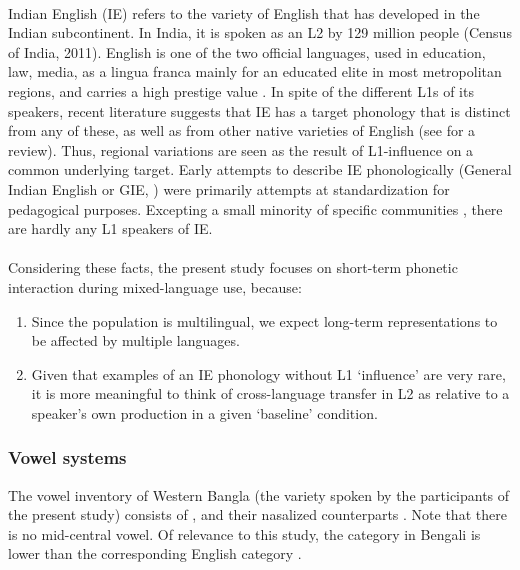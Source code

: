 \documentclass[11pt]{article}
\newcommand{\nt}[1]{\textipa{[#1]}} %
\begin{document}
	\paragraph{}Indian English (IE) refers to the variety of English that has developed in the Indian subcontinent. In India, it is spoken as an L2 by 129 million people (Census of India, 2011).  English is one of the two official languages, used in education, law, media, as a lingua franca mainly for an educated elite in most metropolitan regions, and carries a high prestige value \cite{tollefson2014language}.
	In spite of the different L1s of its speakers, recent literature suggests that IE has a target phonology that is distinct from any of these, as well as from other native varieties of English (see  for a review). Thus, regional variations are seen as the result of L1-influence on a common underlying target. Early attempts to describe IE phonologically (General Indian English or GIE, \cite{masica1972sound}) were primarily attempts at standardization for pedagogical purposes. Excepting a small minority of specific communities \cite{pandey201517}, there are hardly any L1 speakers of IE.\\
	
	\paragraph{}Considering these facts, the present study focuses on short-term phonetic interaction during mixed-language use, because:
\begin{enumerate}[label=(\roman*)]
	\item Since the population is multilingual, we expect long-term representations to be affected by multiple languages. 
	\item Given that examples of an IE phonology without L1 `influence' are very rare, it is more meaningful to think of cross-language transfer in L2 as relative to a speaker's own production in a given `baseline' condition.
\end{enumerate}
	

	\subsubsection{Vowel systems} \label{vowel systems}
	The vowel inventory of Western Bangla (the variety spoken by the participants of the present study) consists of \nt{i, e, \ae, a, O, o, u}, and their nasalized counterparts \cite{garry2001facts}. Note that there is no mid-central vowel. Of relevance to this study, the category \nt{\ae} in Bengali is lower than the corresponding English category \cite{chatterji1921bengali}.\\
	
\end{document}
